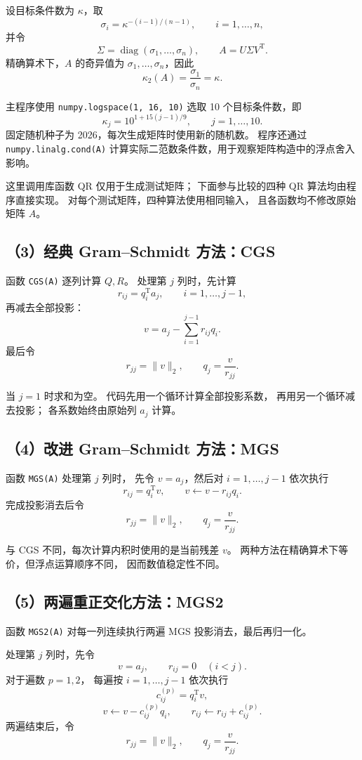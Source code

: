 \documentclass[UTF8,a4paper,11pt,fontset=fandol]{ctexart}
\begin{document}
设目标条件数为 $\kappa$，取
\[
\sigma_i=\kappa^{-(i-1)/(n-1)},
\qquad i=1,\ldots,n,
\]
并令
\[
\Sigma=\operatorname{diag}(\sigma_1,\ldots,\sigma_n),
\qquad A=U\Sigma V^{\mathrm T}.
\]
精确算术下，$A$ 的奇异值为
$\sigma_1,\ldots,\sigma_n$，因此
\[
\kappa_2(A)=\frac{\sigma_1}{\sigma_n}=\kappa.
\]

主程序使用 \texttt{numpy.logspace(1, 16, 10)}
选取 10 个目标条件数，即
\[
\kappa_j=10^{1+15(j-1)/9},
\qquad j=1,\ldots,10.
\]
固定随机种子为 2026，每次生成矩阵时使用新的随机数。
程序还通过
\texttt{numpy.linalg.}\allowbreak\texttt{cond(A)}
计算实际二范数条件数，用于观察矩阵构造中的浮点舍入影响。

这里调用库函数 QR 仅用于生成测试矩阵；
下面参与比较的四种 QR 算法均由程序直接实现。
对每个测试矩阵，四种算法使用相同输入，
且各函数均不修改原始矩阵 $A$。

\subsection*{（3）经典 Gram--Schmidt 方法：CGS}

函数 \texttt{CGS(A)} 逐列计算 $Q,R$。
处理第 $j$ 列时，先计算
\[
r_{ij}=q_i^{\mathrm T}a_j,
\qquad i=1,\ldots,j-1,
\]
再减去全部投影：
\[
v=a_j-\sum_{i=1}^{j-1}r_{ij}q_i.
\]
最后令
\[
r_{jj}=\|v\|_2,
\qquad q_j=\frac{v}{r_{jj}}.
\]

当 $j=1$ 时求和为空。
代码先用一个循环计算全部投影系数，
再用另一个循环减去投影；
各系数始终由原始列 $a_j$ 计算。

\subsection*{（4）改进 Gram--Schmidt 方法：MGS}

函数 \texttt{MGS(A)} 处理第 $j$ 列时，
先令 $v=a_j$，然后对 $i=1,\ldots,j-1$ 依次执行
\[
r_{ij}=q_i^{\mathrm T}v,
\qquad
v\leftarrow v-r_{ij}q_i.
\]
完成投影消去后令
\[
r_{jj}=\|v\|_2,
\qquad q_j=\frac{v}{r_{jj}}.
\]

与 CGS 不同，每次计算内积时使用的是当前残差 $v$。
两种方法在精确算术下等价，但浮点运算顺序不同，
因而数值稳定性不同。

\subsection*{（5）两遍重正交化方法：MGS2}

函数 \texttt{MGS2(A)} 对每一列连续执行两遍
MGS 投影消去，最后再归一化。

处理第 $j$ 列时，先令
\[
v=a_j,\qquad r_{ij}=0\quad(i<j).
\]
对于遍数 $p=1,2$，
每遍按 $i=1,\ldots,j-1$ 依次执行
\[
c_{ij}^{(p)}=q_i^{\mathrm T}v,
\]
\[
v\leftarrow v-c_{ij}^{(p)}q_i,
\qquad
r_{ij}\leftarrow r_{ij}+c_{ij}^{(p)}.
\]
两遍结束后，令
\[
r_{jj}=\|v\|_2,
\qquad q_j=\frac{v}{r_{jj}}.
\]
\end{document}
